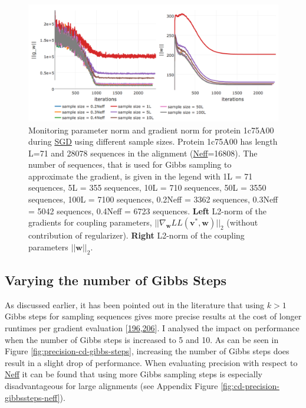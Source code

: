 \documentclass[11pt,a4paper,twoside]{book}
\renewcommand{\v}{\mathbf{v}}
\newcommand{\w}{\mathbf{w}}
\theoremstyle{definition}
\theoremstyle{definition}
\theoremstyle{remark}
\begin{document}
\begin{figure}

{\centering \includegraphics[width=1\linewidth]{img/full_likelihood/gibbs_sampling/1c75A00_gradient_and_parameter_norm_for_samplesizes} 

}

\caption{Monitoring parameter norm and
gradient norm for protein 1c75A00 during \protect\hyperlink{abbrev}{SGD}
using different sample sizes. Protein 1c75A00 has length L=71 and 28078
sequences in the alignment (\protect\hyperlink{abbrev}{Neff}=16808). The
number of sequences, that is used for Gibbs sampling to approximate the
gradient, is given in the legend with 1L = 71 sequences, 5L = 355
sequences, 10L = 710 sequences, 50L = 3550 sequences, 100L = 7100
sequences, 0.2Neff = 3362 sequences, 0.3Neff = 5042 sequences, 0.4Neff =
6723 sequences. \textbf{Left} L2-norm of the gradients for coupling
parameters, \(||\nabla_{\w} L\!L(\v^*, \w)||_2\) (without contribution
of regularizer). \textbf{Right} L2-norm of the coupling parameters
\(||\w||_2\).}\label{fig:cd-samplesize-protein1c75a00}
\end{figure}

\subsection{Varying the number of Gibbs Steps}\label{cd-gibbs-steps}

As discussed earlier, it has been pointed out in the literature that
using \(k>1\) Gibbs steps for sampling sequences gives more precise
results at the cost of longer runtimes per gradient evaluation
{[}\protect\hyperlink{ref-Bengio2009}{196},\protect\hyperlink{ref-Tieleman2008}{206}{]}.
I analysed the impact on performance when the number of Gibbs steps is
increased to 5 and 10. As can be seen in Figure
\ref{fig:precision-cd-gibbs-steps}, increasing the number of Gibbs steps
does result in a slight drop of performance. When evaluating precision
with respect to \protect\hyperlink{abbrev}{Neff} it can be found that
using more Gibbs sampling steps is especially disadvantageous for large
alignments (see Appendix Figure \ref{fig:cd-precision-gibbssteps-neff}).
\end{document}
